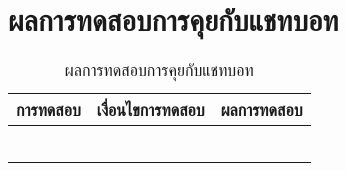 \section{ผลการทดสอบการคุยกับแชทบอท}
\begin{table}[H]
	\caption{ผลการทดสอบการคุยกับแชทบอท}
    \centering	
	\label{tab:test4}
    \begin{tabular}{ | p{4cm} | p{4cm} | p{4cm}  | }
		\hline
	\multicolumn{1}{|c|}{การทดสอบ} & \multicolumn{1}{c|}{เงื่อนไขการทดสอบ} & \multicolumn{1}{c|}{ผลการทดสอบ} \\ \hline
	\setstretch{1.0}{ทดสอบคุยกับแชทบอท}
	& \setstretch{1.0}{ผู้ใช้เข้ามาในหน้าแชทบอท}
	& \setstretch{1.0}{ระบบจะแสดงหน้าหน้าแชทบอท} \\ \cline{2-3} 
	& \setstretch{1.0}{ผู้ใช้ส่งข้อความโดยไม่ระบุข้อความ} 
	& \setstretch{1.0}{ระบบจะไม่ส่งข้อความไปยังแชทบอท} \\ \cline{2-3} 
	& \setstretch{1.0}{ผู้ใช้ส่งข้อความโดยระบุข้อความ} 
	& \setstretch{1.0}{ระบบจะส่งข้อความไปยังแชทบอท} \\ \cline{2-3} 
	& \setstretch{1.0}{ผู้ใช้กดเลือกปุ่มพิมพ์ด้วยเสียง และพูด} 
	& \setstretch{1.0}{ระบบจะแปลงเสียงเป็นข้อความแล้วส่งไปยังแชทบอท} \\ \cline{2-3} 
	& \setstretch{1.0}{ผู้ใช้กดเลือกปุ่มพิมพ์ด้วยเสียง และไม่พูด} 
	& \setstretch{1.0}{ระบบจะไม่ส่งข้อความไปยังแชทบอท} \\ \cline{2-3} 
	& \setstretch{1.0}{เมื่อผู้ใช้กดปุ่มฟังเสียงที่ข้อความ} 
	& \setstretch{1.0}{ระบบจะพูดตามข้อความที่แชทบอทได้ส่งกลับคืนมา} \\ \hline
    \end{tabular}
\end{table}

